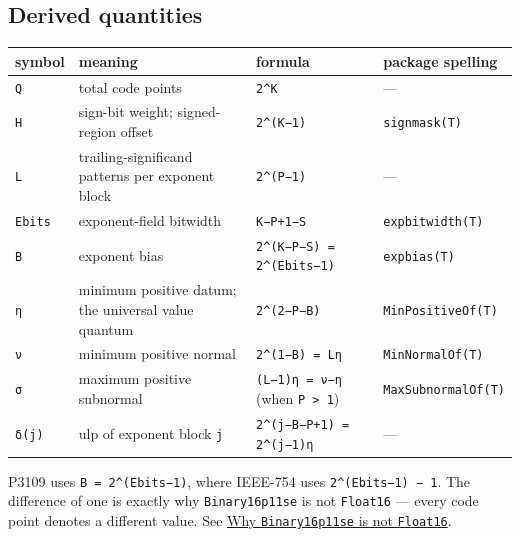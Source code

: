 \subsection{Derived quantities}



\label{17844395547246303543}{}



\begin{table}[h]
\centering
\begin{tabulary}{\linewidth}{L L L L}
\toprule
symbol & meaning & formula & package spelling \\
\toprule
\texttt{Q} & total code points & \texttt{2{\textasciicircum}K} & — \\
\texttt{H} & sign-bit weight; signed-region offset & \texttt{2{\textasciicircum}(K−1)} & \texttt{signmask(T)} \\
\texttt{L} & trailing-significand patterns per exponent block & \texttt{2{\textasciicircum}(P−1)} & — \\
\texttt{Ebits} & exponent-field bitwidth & \texttt{K−P+1−S} & \texttt{expbitwidth(T)} \\
\texttt{B} & exponent bias & \texttt{2{\textasciicircum}(K−P−S) = 2{\textasciicircum}(Ebits−1)} & \texttt{expbias(T)} \\
\texttt{η} & minimum positive datum; the universal value quantum & \texttt{2{\textasciicircum}(2−P−B)} & \texttt{MinPositiveOf(T)} \\
\texttt{ν} & minimum positive normal & \texttt{2{\textasciicircum}(1−B) = Lη} & \texttt{MinNormalOf(T)} \\
\texttt{σ} & maximum positive subnormal & \texttt{(L−1)η = ν−η} (when \texttt{P > 1}) & \texttt{MaxSubnormalOf(T)} \\
\texttt{δ(j)} & ulp of exponent block \texttt{j} & \texttt{2{\textasciicircum}(j−B−P+1) = 2{\textasciicircum}(j−1)η} & — \\
\bottomrule
\end{tabulary}

\end{table}



\begin{tcolorbox}[toptitle=-1mm,bottomtitle=1mm,colback=admonition-warning!50!white,colframe=admonition-warning,title=\textbf{The bias is not the IEEE-754 one}]
P3109 uses \texttt{B = 2{\textasciicircum}(Ebits−1)}, where IEEE-754 uses \texttt{2{\textasciicircum}(Ebits−1) − 1}. The difference of one is exactly why \texttt{Binary16p11se} is not \texttt{Float16} — every code point denotes a different value. See \href{workflow\_\allowbreak{}float16.md}{Why \texttt{Binary16p11se} is not \texttt{Float16}}.

\end{tcolorbox}



